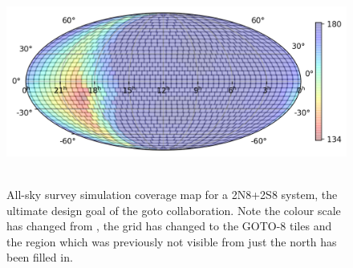 \begin{colsection}
\begin{colsection}
\begin{figure}[p]
    \begin{center}
        \includegraphics[height=190pt]{images/survey_sims/365_2N8+2S8_lite.png}
    \end{center}
    \caption[All-sky survey simulation results: 2N8+2S8 system]{
        All-sky survey simulation coverage map for a 2N8+2S8 system, the ultimate design goal of the \gls{goto} collaboration. Note the colour scale has changed from , the grid has changed to the GOTO-8 tiles and the region which was previously not visible from just the north has been filled in.
    }\label{fig:survey_sim_2n8+2s8}
\end{figure}


\clearpage


\end{colsection}
\end{colsection}
